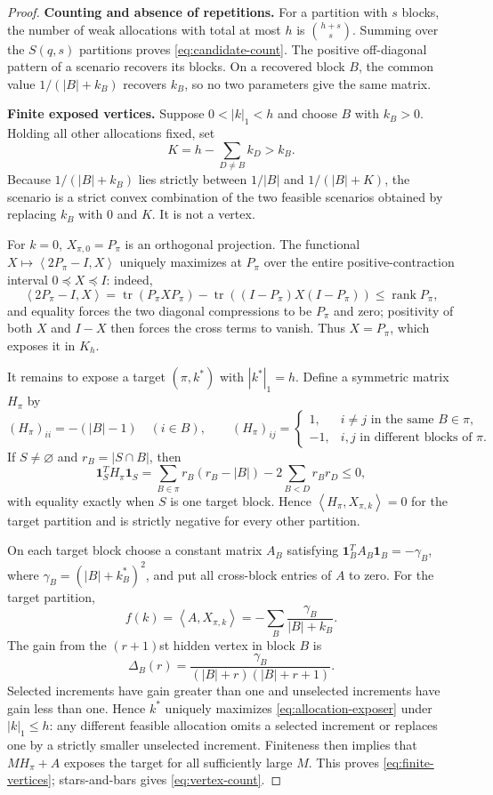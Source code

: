 \documentclass[journal,10pt]{IEEEtran}
\theoremstyle{definition}
\theoremstyle{remark}
\newcommand{\one}{\mathbf 1}
\newcommand{\tr}{\operatorname{tr}}
\newcommand{\rank}{\operatorname{rank}}
\newcommand{\ip}[2]{\left\langle #1,#2\right\rangle}
\begin{document}
\begin{proof}
\textbf{Counting and absence of repetitions.}
For a partition with $s$ blocks, the number of weak allocations with total at
most $h$ is $\binom{h+s}{s}$.  Summing over the $S(q,s)$ partitions proves
\eqref{eq:candidate-count}.  The positive off-diagonal pattern of a scenario
recovers its blocks.  On a recovered block $B$, the common value
$1/(|B|+k_B)$ recovers $k_B$, so no two parameters give the same matrix.

\textbf{Finite exposed vertices.}
Suppose $0<|k|_1<h$ and choose $B$ with $k_B>0$.  Holding all other
allocations fixed, set
\[
  K=h-\sum_{D\neq B}k_D>k_B.
\]
Because $1/(|B|+k_B)$ lies strictly between $1/|B|$ and
$1/(|B|+K)$, the scenario is a strict convex combination of the two feasible
scenarios obtained by replacing $k_B$ with $0$ and $K$.  It is not a vertex.

For $k=0$, $X_{\pi,0}=P_\pi$ is an orthogonal projection.  The functional
$X\mapsto\ip{2P_\pi-I}{X}$ uniquely maximizes at $P_\pi$ over the entire
positive-contraction interval $0\preceq X\preceq I$: indeed,
\[
 \ip{2P_\pi-I}{X}
 =\tr(P_\pi XP_\pi)-\tr((I-P_\pi)X(I-P_\pi))
 \leq\rank P_\pi,
\]
and equality forces the two diagonal compressions to be $P_\pi$ and zero;
positivity of both $X$ and $I-X$ then forces the cross terms to vanish.  Thus
$X=P_\pi$, which exposes it in $K_h$.

It remains to expose a target $(\pi,k^*)$ with $|k^*|_1=h$.  Define a symmetric
matrix $H_\pi$ by
\[
 (H_\pi)_{ii}=-(|B|-1)\quad(i\in B),
 \qquad
 (H_\pi)_{ij}=
 \begin{cases}
  1,&i\neq j\text{ in the same }B\in\pi,\\
  -1,&i,j\text{ in different blocks of }\pi.
 \end{cases}
\]
If $S\neq\varnothing$ and $r_B=|S\cap B|$, then
\begin{equation}
  \one_S^TH_\pi\one_S
  =\sum_{B\in\pi}r_B(r_B-|B|)
   -2\sum_{B<D}r_Br_D\leq0,
  \label{eq:partition-separator}
\end{equation}
with equality exactly when $S$ is one target block.  Hence
$\ip{H_\pi}{X_{\pi,k}}=0$ for the target partition and is strictly negative
for every other partition.

On each target block choose a constant matrix $A_B$ satisfying
$\one_B^TA_B\one_B=-\gamma_B$, where
$\gamma_B=(|B|+k_B^*)^2$, and put all cross-block entries of $A$ to zero.
For the target partition,
\begin{equation}
  f(k)=\ip{A}{X_{\pi,k}}
      =-\sum_B\frac{\gamma_B}{|B|+k_B}.
  \label{eq:allocation-exposer}
\end{equation}
The gain from the $(r+1)$st hidden vertex in block $B$ is
\[
  \Delta_B(r)
  =\frac{\gamma_B}{(|B|+r)(|B|+r+1)}.
\]
Selected increments have gain greater than one and unselected increments have
gain less than one.  Hence $k^*$ uniquely maximizes
\eqref{eq:allocation-exposer} under $|k|_1\leq h$: any different feasible
allocation omits a selected increment or replaces one by a strictly smaller
unselected increment.  Finiteness then implies
that $MH_\pi+A$ exposes the target for all sufficiently
large $M$.  This proves \eqref{eq:finite-vertices}; stars-and-bars gives
\eqref{eq:vertex-count}.


\end{proof}
\end{document}
